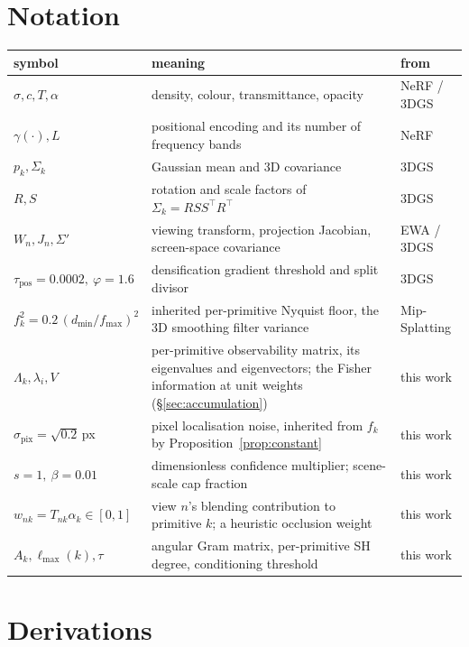 \chapter{Notation}
\label{app:notation}
\begin{table}[htbp]
  \centering
  \small
  \begin{tabularx}{\linewidth}{L{0.85}L{1.60}L{0.55}}
    \toprule
    symbol & meaning & from \\
    \midrule
    $\sigma, c, T, \alpha$ & density, colour, transmittance, opacity & NeRF / 3DGS \\
    $\gamma(\cdot), L$ & positional encoding and its number of frequency bands & NeRF \\
    $p_k, \Sigma_k$ & Gaussian mean and 3D covariance & 3DGS \\
    $R, S$ & rotation and scale factors of $\Sigma_k = RSS^{\!\top}R^{\!\top}$ & 3DGS \\
    $W_n, J_n, \Sigma'$ & viewing transform, projection Jacobian, screen-space covariance & EWA / 3DGS \\
    $\tau_{\mathrm{pos}}=0.0002,\ \varphi=1.6$ & densification gradient threshold and split divisor & 3DGS \\
    $f_k^2 = 0.2\,(d_{\min}/f_{\max})^2$ & inherited per-primitive Nyquist floor, the 3D smoothing filter variance & Mip-Splatting \\
    $\Lambda_k, \lambda_i, V$ & per-primitive observability matrix, its eigenvalues and eigenvectors; the Fisher information at unit weights (\S\ref{sec:accumulation}) & this work \\
    $\sigma_{\mathrm{pix}} = \sqrt{0.2}$\,px & pixel localisation noise, inherited from $f_k$ by Proposition~\ref{prop:constant} & this work \\
    $s = 1,\ \beta = 0.01$ & dimensionless confidence multiplier; scene-scale cap fraction & this work \\
    $w_{nk} = T_{nk}\alpha_k \in [0,1]$ & view $n$'s blending contribution to primitive $k$; a heuristic occlusion weight & this work \\
    $A_k, \ell_{\max}(k), \tau$ & angular Gram matrix, per-primitive SH degree, conditioning threshold & this work \\
    \bottomrule
  \end{tabularx}
\end{table}

\chapter{Derivations}
\label{app:derivations}


